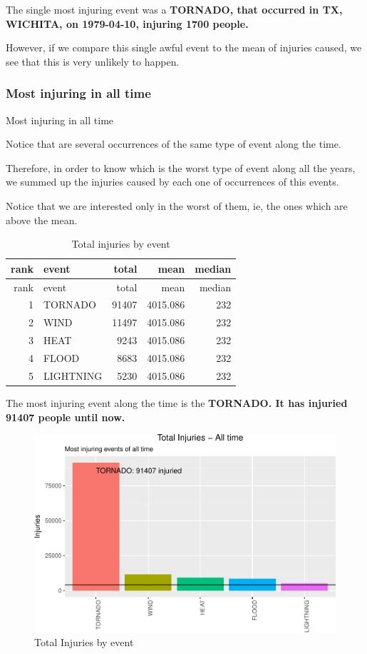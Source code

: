 The single most injuring event was a \textbf{TORNADO, that occurred in
TX, WICHITA, on 1979-04-10, injuring 1700 people.}

However, if we compare this single awful event to the mean of injuries
caused, we see that this is very unlikely to happen.

\subsubsection{Most injuring in all
time}\label{most-injuring-in-all-time}

Most injuring in all time

Notice that are several occurrences of the same type of event along the
time.

Therefore, in order to know which is the worst type of event along all
the years, we summed up the injuries caused by each one of occurrences
of this events.

Notice that we are interested only in the worst of them, ie, the ones
which are above the mean.

\begin{longtable}[]{@{}rlrrr@{}}
\caption{Total injuries by event}\tabularnewline
\toprule
rank & event & total & mean & median\tabularnewline
\midrule
\endfirsthead
\toprule
rank & event & total & mean & median\tabularnewline
\midrule
\endhead
1 & TORNADO & 91407 & 4015.086 & 232\tabularnewline
2 & WIND & 11497 & 4015.086 & 232\tabularnewline
3 & HEAT & 9243 & 4015.086 & 232\tabularnewline
4 & FLOOD & 8683 & 4015.086 & 232\tabularnewline
5 & LIGHTNING & 5230 & 4015.086 & 232\tabularnewline
\bottomrule
\end{longtable}

The most injuring event along the time is the \textbf{TORNADO. It has
injuried 91407 people until now.}

\suppressfloats\begin{figure}[htbp]
\centering
\includegraphics{readme_files/figure-latex/injuring-all-plot-1.pdf}
\caption{Total Injuries by event}
\end{figure}

